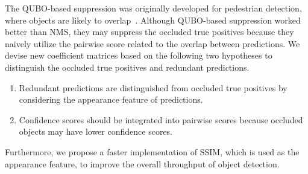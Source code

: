 The QUBO-based suppression was originally developed for pedestrian detection, where objects are likely to overlap~\cite{rujikietgumjorn2013qubo}.
Although QUBO-based suppression worked better than NMS, they may suppress the occluded true positives because they naively utilize the pairwise score related to the overlap between predictions. 
We devise new coefficient matrices based on the following two hypotheses to distinguish the occluded true positives and redundant predictions.
\begin{enumerate}
    \item Redundant predictions are distinguished from occluded true positives by considering the appearance feature of predictions.
    \item Confidence scores should be integrated into pairwise scores because occluded objects may have lower confidence scores.
\end{enumerate}
Furthermore, we propose a faster implementation of SSIM, which is used as the appearance feature, to improve the overall throughput of object detection.


